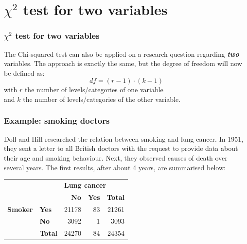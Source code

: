 \documentclass{beamer}
\begin{document}
\section{$\chi^{2}$ test for two variables}
\sectionframelogo{}

\begin{frame}
  \frametitle{$\chi^{2}$ test for two variables}
  The Chi-squared test can also be applied on a research question regarding \textbf{\textit{two}} variables.
\vfill
  The approach is exactly the same, but the degree of freedom will now be defined as:
 \[ df = (r-1) \cdot (k-1) \]
  with $r$ the number of levels/categories of one variable\\
  and $k$ the number of levels/categories of the other variable.
\end{frame}

\begin{frame}
  \frametitle{Example: smoking doctors}
  
  Doll and Hill researched the relation between smoking and lung cancer. In 1951, they sent a letter to all British doctors with the request to provide data about their age and smoking behaviour.
\vfill  
  Next, they observed causes of death over several years. The first results, after about 4 years, are summarised below:
\vfill  
  \begin{table}[h]
    \begin{tabular}{@{}|ll|rr|r|@{}}
    	\toprule
    	                & & \multicolumn{3}{l|}{\textbf{Lung cancer}} \\
    	                & & \textbf{No} & \textbf{Yes} & \textbf{Total} \\ \midrule
    	\textbf{Smoker} & \textbf{Yes}         & 21178       & 83           & 21261          \\
    	                & \textbf{No}          & 3092        & 1            & 3093           \\ \midrule
    	                & \textbf{Total}       & 24270       & 84           & 24354          \\ \bottomrule
    \end{tabular}
  \end{table}
\end{frame}
\end{document}
